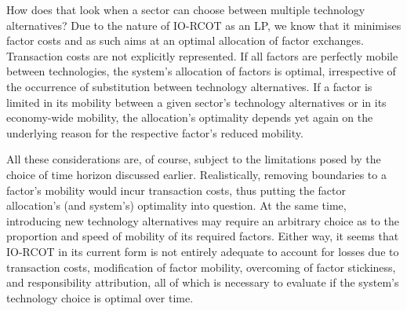 How does that look when a sector can choose between multiple technology alternatives? Due to the nature of IO-RCOT as an LP, we know that it minimises factor costs and as such aims at an optimal allocation of factor exchanges. Transaction costs are not explicitly represented. If all factors are perfectly mobile between technologies, the system's allocation of factors is optimal, irrespective of the occurrence of substitution between technology alternatives. If a factor is limited in its mobility between a given sector's technology alternatives or in its economy-wide mobility, the allocation's optimality depends yet again on the underlying reason for the respective factor's reduced mobility.

All these considerations are, of course, subject to the limitations posed by the choice of time horizon discussed earlier. Realistically, removing boundaries to a factor's mobility would incur transaction costs, thus putting the factor allocation's (and system's) optimality into question. At the same time, introducing new technology alternatives may require an arbitrary choice as to the proportion and speed of mobility of its required factors. Either way, it seems that IO-RCOT in its current form is not entirely adequate to account for losses due to transaction costs, modification of factor mobility, overcoming of factor stickiness, and responsibility attribution, all of which is necessary to evaluate if the system's technology choice is optimal over time.